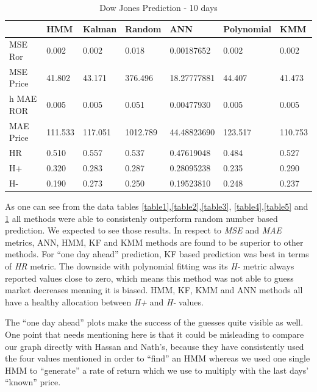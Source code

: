 \begin{table}[h]
\caption{\label{table6}Dow Jones Prediction - 10 days}
\vspace{0.3cm}
\begin{tabular}{|l|l|l|l|l|l|l|}
\hline
 &                  HMM &       Kalman &   Random &        ANN &     Polynomial &    KMM\\
\hline
   MSE Ror &      0.002 &      0.002 &      0.018 & 0.00187652 &      0.002 &      0.002\\
\hline
 MSE Price &     41.802 &     43.171 &    376.496 & 18.27777881 &     44.407 &     41.473\\
\hline
h   MAE ROR &      0.005 &      0.005 &      0.051 & 0.00477930 &      0.005 &      0.005\\
\hline
 MAE Price &    111.533 &    117.051 &   1012.789 & 44.48823690 &    123.517 &    110.753\\
\hline
        HR &      0.510 &      0.557 &      0.537 & 0.47619048 &      0.484 &      0.527\\
\hline
        H+ &      0.320 &      0.283 &      0.287 & 0.28095238 &      0.235 &      0.290\\
\hline
        H- &      0.190 &      0.273 &      0.250 & 0.19523810 &      0.248 &      0.237\\
\hline
\end{tabular}
\end{table}


As one can see from the data tables \ref{table1},\ref{table2},\ref{table3},
\ref{table4},\ref{table5} and \ref{table6} all methods were able to consistenly
outperform random number based prediction. We expected to see those results. In
respect to {\em MSE} and {\em MAE} metrics, ANN, HMM, KF and KMM methods are
found to be superior to other methods. For ``one day ahead'' prediction, KF
based prediction was best in terms of {\em HR} metric. The downside with
polynomial fitting was its {\em H-} metric always reported values close to zero,
which means this method was not able to guess market decreases meaning it is
biased. HMM, KF, KMM and ANN methods all have a healthy allocation between {\em
  H+} and {\em H-} values.


The ``one day ahead'' plots make the success of the guesses quite visible as
well. One point that needs mentioning here is that it could be misleading to
compare our graph directly with Hassan and Nath's, because they have
consistently used the four values mentioned in order to ``find'' an HMM whereas
we used one single HMM to ``generate'' a rate of return which we use to multiply
with the last days' ``known'' price.

